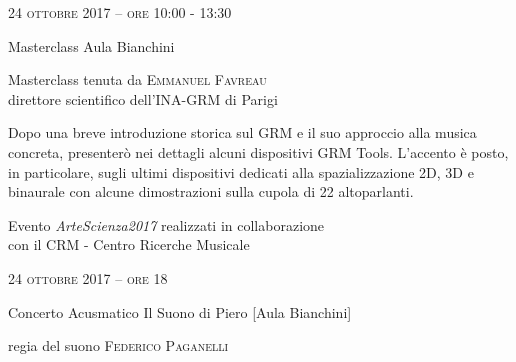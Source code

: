 
\begin{flushleft}

\large{
	\scshape{
	24 ottobre 2017 -- ore 10:00 - 13:30
	}}

\medskip
	
\small{Masterclass
	\newline Aula Bianchini}

\medskip

{\fontsize{20}{20} }

\normalfont

\normalsize

\bigskip

Masterclass tenuta da \textsc{Emmanuel Favreau}\\{\footnotesize direttore scientifico dell'INA-GRM di Parigi}


\bigskip

Dopo una breve introduzione storica sul GRM e il suo approccio alla musica concreta, presenterò nei dettagli alcuni dispositivi GRM Tools. L’accento è posto, in particolare, sugli ultimi dispositivi dedicati alla spazializzazione 2D, 3D e binaurale con alcune dimostrazioni sulla cupola di 22 altoparlanti.

\bigskip

\small{Evento \textit{ArteScienza2017} realizzati in collaborazione\\con il CRM - Centro Ricerche Musicale}

\vfill

\large{
	\scshape{
	24 ottobre 2017 -- ore 18
	}}

\medskip

\small{Concerto Acusmatico
	\newline Il Suono di Piero [Aula Bianchini]}

\medskip


{\fontsize{20}{20} }

\normalsize

\medskip

regia del suono \textsc{Federico Paganelli}

\bigskip

\medskip

\medskip


\end{flushleft}
